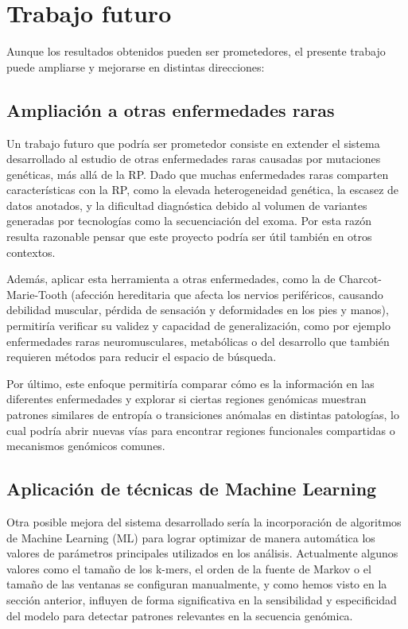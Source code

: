 \documentclass[11pt,spanish,listoffigures,listoftables]{tfgetsinf}
\begin{document}
\section{Trabajo futuro}

Aunque los resultados obtenidos pueden ser prometedores, el presente trabajo puede ampliarse y mejorarse en distintas direcciones:

\subsection{Ampliación a otras enfermedades raras}

Un trabajo futuro que podría ser prometedor consiste en extender el sistema desarrollado al estudio de otras enfermedades raras causadas por mutaciones genéticas, más allá de la \ac{RP}. Dado que muchas enfermedades raras comparten características con la \ac{RP}, como la elevada heterogeneidad genética, la escasez de datos anotados, y la dificultad diagnóstica debido al volumen de variantes generadas por tecnologías como la secuenciación del exoma. Por esta razón resulta razonable pensar que este proyecto podría ser útil también en otros contextos.

Además, aplicar esta herramienta a otras enfermedades, como la de Charcot-Marie-Tooth (afección hereditaria que afecta los nervios periféricos, causando debilidad muscular, pérdida de sensación y deformidades en los pies y manos\cite{MEDL}), permitiría verificar su validez y capacidad de generalización, como por ejemplo enfermedades raras neuromusculares, metabólicas o del desarrollo que también requieren métodos para reducir el espacio de búsqueda.

Por último, este enfoque permitiría comparar cómo es la información en las diferentes enfermedades y explorar si ciertas regiones genómicas muestran patrones similares de entropía o transiciones anómalas en distintas patologías, lo cual podría abrir nuevas vías para encontrar regiones funcionales compartidas o mecanismos genómicos comunes.

\subsection{Aplicación de técnicas de Machine Learning}

Otra posible mejora del sistema desarrollado sería la incorporación de algoritmos de Machine Learning (\ac{ML}) para lograr optimizar de manera automática los valores de parámetros principales utilizados en los análisis. Actualmente algunos valores como el tamaño de los k-mers, el orden de la fuente de Markov o el tamaño de las ventanas se configuran manualmente, y como hemos visto en la sección anterior, influyen de forma significativa en la sensibilidad y especificidad del modelo para detectar patrones relevantes en la secuencia genómica.
\end{document}
